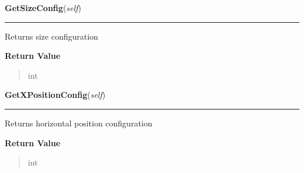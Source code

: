     \label{ImagePanel:ImagePanel:GetSizeConfig}

    \vspace{0.5ex}

\hspace{.8\funcindent}\begin{boxedminipage}{\funcwidth}

    \raggedright \textbf{GetSizeConfig}(\textit{self})

    \vspace{-1.5ex}

    \rule{\textwidth}{0.5\fboxrule}
\setlength{\parskip}{2ex}
    Returns size configuration

\setlength{\parskip}{1ex}
      \textbf{Return Value}
    \vspace{-1ex}

      \begin{quote}
      int

      \end{quote}

    \end{boxedminipage}

    \label{ImagePanel:ImagePanel:GetXPositionConfig}

    \vspace{0.5ex}

\hspace{.8\funcindent}\begin{boxedminipage}{\funcwidth}

    \raggedright \textbf{GetXPositionConfig}(\textit{self})

    \vspace{-1.5ex}

    \rule{\textwidth}{0.5\fboxrule}
\setlength{\parskip}{2ex}
    Returns horizontal position configuration

\setlength{\parskip}{1ex}
      \textbf{Return Value}
    \vspace{-1ex}

      \begin{quote}
      int

      \end{quote}

    \end{boxedminipage}

